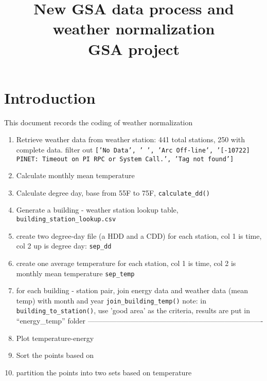 \documentclass[12pt]{article}
\begin{document}
\title{New GSA data process and weather normalization\\
       \large GSA project}
\maketitle
\tableofcontents
\newpage
\section{Introduction}\label{sec:intro}
This document records the coding of weather normalization

\begin{enumerate}
\item Retrieve weather data from weather station: 441 total stations, 250 with complete data.
  filter out \texttt{['No Data', ' ', 'Arc Off-line', '[-10722] PINET: Timeout on PI RPC or System Call.', 'Tag not found']}
\item Calculate monthly mean temperature
\item Calculate degree day, base from 55F to 75F, \texttt{calculate_dd()}
\item Generate a building - weather station lookup table, \texttt{building_station_lookup.csv}
\item create two degree-day file (a HDD and a CDD) for each station, col 1 is time, col 2 up is degree day: \texttt{sep_dd}
\item create one average temperature for each station, col 1 is time, col 2 is monthly mean temperature \texttt{sep_temp}
\item for each building - station pair, join energy data and weather data (mean temp) with month and year \texttt{join_building_temp()}
  note: in \texttt{building_to_station()}, use 'good area' as the criteria, results are put in ``energy_temp'' folder
  -------------------------------------------------------------------------
\item Plot temperature-energy
\item Sort the points based on
\item partition the points into two sets based on temperature
\end{enumerate}

\newpage
 
\end{document}
